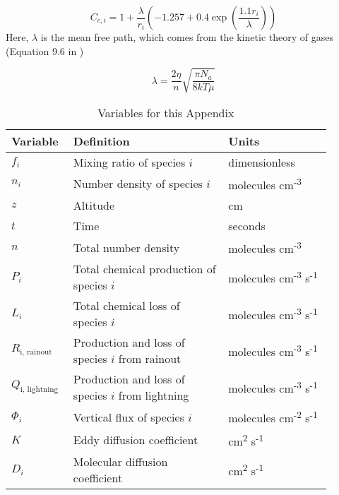 \begin{equation} \label{eq:slip_correction}
  C_{c,i} = 1 + \frac{\lambda}{r_i}\left( -1.257 + 0.4 \exp \left(\frac{1.1 r_i}{\lambda}\right) \right)
\end{equation}
Here, $\lambda$ is the mean free path, which comes from the kinetic theory of gases (Equation 9.6 in \citet{Seinfeld_2006})

\begin{equation}
  \lambda = \frac{2 \eta}{n} \sqrt{\frac{\pi N_a}{8 k T \overline{\mu}}}
\end{equation}

\begin{table}
  \centering
  \begin{tabularx}{\linewidth}{p{0.15\linewidth} | p{0.45\linewidth} | p{0.3\linewidth}} \caption{Variables for this Appendix} \label{tab:appendix_variables} \\
  \hline \hline
  Variable & Definition & Units \\
  \hline
  \(f_{i}\) & Mixing ratio of species \(i\) & dimensionless \\
  \(n_{i}\) & Number density of species \(i\) & molecules
  cm\textsuperscript{-3} \\
  \(z\) & Altitude & cm \\
  \(t\) & Time & seconds \\
  \(n\) & Total number density & molecules
  cm\textsuperscript{-3} \\
  \(P_{i}\) & Total chemical production of species \(i\) & molecules
  cm\textsuperscript{-3} s\textsuperscript{-1} \\
  \(L_{i}\) & Total chemical loss of species \(i\) & molecules
  cm\textsuperscript{-3} s\textsuperscript{-1} \\
  \(R_{\text{i, rainout}}\) & Production and loss of species \(i\) from
  rainout & molecules cm\textsuperscript{-3}
  s\textsuperscript{-1} \\
  \(Q_{\text{i, lightning}}\) & Production and loss of species \(i\)
  from lightning & molecules cm\textsuperscript{-3}
  s\textsuperscript{-1} \\
  \(\Phi_{i}\) & Vertical flux of species \(i\) & molecules
  cm\textsuperscript{-2} s\textsuperscript{-1} \\
  \(K\) & Eddy diffusion coefficient & cm\textsuperscript{2}
  s\textsuperscript{-1} \\
  \(D_{i}\) & Molecular diffusion coefficient & cm\textsuperscript{2}
  s\textsuperscript{-1} \\

\end{tabularx}
\end{table}
